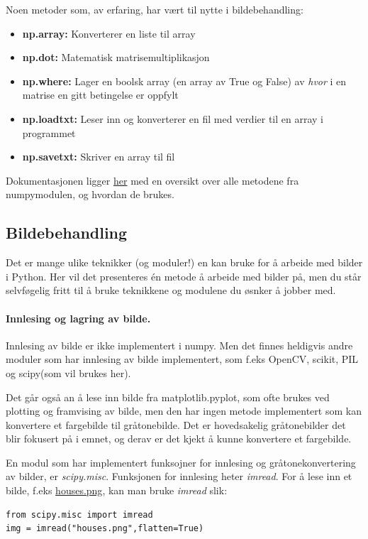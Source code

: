 \documentclass[%
oneside,                 %
final,                   %
10pt,norsk]{article}
\begin{document}
Noen metoder som, av erfaring, har vært til nytte i bildebehandling:
\begin{itemize}
\item \textbf{np.array:} Konverterer en liste til array

\item \textbf{np.dot:} Matematisk matrisemultiplikasjon

\item \textbf{np.where:} Lager en boolsk array (en array av True og False) av \emph{hvor} i en matrise en gitt betingelse er oppfylt

\item \textbf{np.loadtxt:} Leser inn og konverterer en fil med verdier til en array i programmet

\item \textbf{np.savetxt:} Skriver en array til fil
\end{itemize}

\noindent
Dokumentasjonen ligger \href{{https://docs.scipy.org/doc/numpy/reference/}}{her} med en oversikt over alle metodene fra numpymodulen, og hvordan de brukes.


\subsection{Bildebehandling}
Det er mange ulike teknikker (og moduler!) en kan bruke for å arbeide med bilder i Python. Her vil det presenteres én metode å arbeide med bilder på, men
du står selvføgelig fritt til å bruke teknikkene og modulene du øsnker å jobber med.

\paragraph{Innlesing og lagring av bilde.}
Innlesing av bilde er ikke implementert i numpy. Men det finnes heldigvis andre moduler som har innlesing av bilde implementert, som f.eks OpenCV, scikit, PIL og scipy(som vil brukes her).

Det går også an å lese inn bilde fra matplotlib.pyplot, som ofte brukes ved plotting og framvising av bilde, men den har ingen metode implementert som kan konvertere et fargebilde til gråtonebilde.
Det er hovedsakelig gråtonebilder det blir fokusert på i emnet, og derav er det kjekt å kunne konvertere et fargebilde.



\vspace{3mm}


En modul som har implementert funksojner for innlesing og gråtonekonvertering av bilder, er \emph{scipy.misc}.
Funksjonen for innlesing heter \emph{imread}. For å lese inn et bilde, f.eks \href{{https://github.com/krisbhei/INF2310/raw/master/Programmering/Python/houses.png}}{houses.png}, kan man bruke \emph{imread} slik:
\begin{verbatim}
from scipy.misc import imread
img = imread("houses.png",flatten=True)
\end{verbatim}
\end{document}
